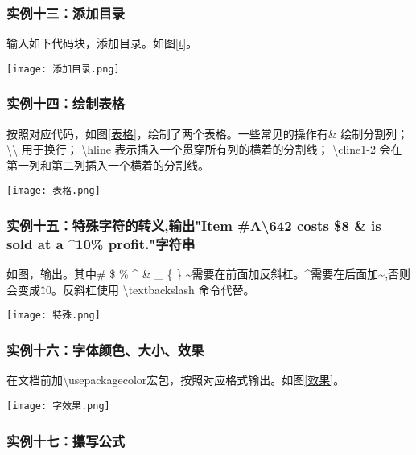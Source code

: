 \documentclass[a4paper]{article}
\begin{document}
\subsubsection{实例十三：添加目录}
输入如下代码块，添加目录。如图\ref{t}。
\begin{figure*}[!h]
    \centering
    \texttt{[image: 添加目录.png]}
    \caption{添加目录}
    \label{t}
\end{figure*}
\subsubsection{实例十四：绘制表格}
按照对应代码，如图\ref{表格}，绘制了两个表格。一些常见的操作有\& 绘制分割列；
\textbackslash{}\textbackslash{} 用于换行；
\textbackslash{}hline 表示插入一个贯穿所有列的横着的分割线；
\textbackslash{}cline{1-2} 会在第一列和第二列插入一个横着的分割线。
\begin{figure*}[!htb]
    \centering
    \texttt{[image: 表格.png]}
    \caption{表格}
    \label{表格}
\end{figure*}
\subsubsection{实例十五：特殊字符的转义,输出"Item \#A\textbackslash642 costs \$8 \& is sold at a \^{}10\% profit."字符串}

如图，输出。其中\# \$ \% \^{} \& \_ \{ \} \~{}需要在前面加反斜杠。\^{}需要在后面加\~{},否则会变成\^10。反斜杠使用 \textbackslash{}textbackslash 命令代替。
\begin{figure*}[!h]
    \centering
    \texttt{[image: 特殊.png]}
    \caption{特殊字符}
    \label{特殊字符}
\end{figure*}

\subsubsection{实例十六：字体颜色、大小、效果}
在文档前加\textbackslash{}usepackage{color}宏包，按照对应格式输出。如图\ref{效果}。
\begin{figure*}[!h]
    \centering
    \texttt{[image: 字效果.png]}
    \caption{字效果、大小、颜色}
    \label{效果}
\end{figure*}
\subsubsection{实例十七：攥写公式}
\end{document}
